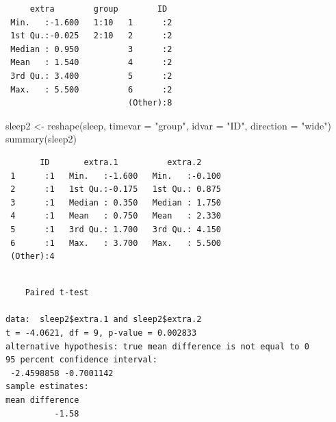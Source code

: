 \documentclass[
  letterpaper,
  DIV=11,
  numbers=noendperiod]{scrreprt}
\newenvironment{Shaded}{\begin{snugshade}}{\end{snugshade}}
\newcommand{\AttributeTok}[1]{\textcolor[rgb]{0.40,0.45,0.13}{#1}}
\newcommand{\ConstantTok}[1]{\textcolor[rgb]{0.56,0.35,0.01}{#1}}
\newcommand{\FloatTok}[1]{\textcolor[rgb]{0.68,0.00,0.00}{#1}}
\newcommand{\FunctionTok}[1]{\textcolor[rgb]{0.28,0.35,0.67}{#1}}
\newcommand{\NormalTok}[1]{\textcolor[rgb]{0.00,0.23,0.31}{#1}}
\newcommand{\OtherTok}[1]{\textcolor[rgb]{0.00,0.23,0.31}{#1}}
\newcommand{\SpecialCharTok}[1]{\textcolor[rgb]{0.37,0.37,0.37}{#1}}
\newcommand{\StringTok}[1]{\textcolor[rgb]{0.13,0.47,0.30}{#1}}
\begin{document}
\begin{verbatim}
     extra        group        ID   
 Min.   :-1.600   1:10   1      :2  
 1st Qu.:-0.025   2:10   2      :2  
 Median : 0.950          3      :2  
 Mean   : 1.540          4      :2  
 3rd Qu.: 3.400          5      :2  
 Max.   : 5.500          6      :2  
                         (Other):8  
\end{verbatim}

\begin{Shaded}
\begin{Highlighting}[]
\NormalTok{sleep2 }\OtherTok{\textless{}{-}} \FunctionTok{reshape}\NormalTok{(sleep, }\AttributeTok{timevar =} \StringTok{"group"}\NormalTok{, }\AttributeTok{idvar =} \StringTok{"ID"}\NormalTok{, }\AttributeTok{direction =} \StringTok{"wide"}\NormalTok{)}
\FunctionTok{summary}\NormalTok{(sleep2)}
\end{Highlighting}
\end{Shaded}

\begin{verbatim}
       ID       extra.1          extra.2      
 1      :1   Min.   :-1.600   Min.   :-0.100  
 2      :1   1st Qu.:-0.175   1st Qu.: 0.875  
 3      :1   Median : 0.350   Median : 1.750  
 4      :1   Mean   : 0.750   Mean   : 2.330  
 5      :1   3rd Qu.: 1.700   3rd Qu.: 4.150  
 6      :1   Max.   : 3.700   Max.   : 5.500  
 (Other):4                                    
\end{verbatim}

\begin{Shaded}
\end{Shaded}

\begin{verbatim}

    Paired t-test

data:  sleep2$extra.1 and sleep2$extra.2
t = -4.0621, df = 9, p-value = 0.002833
alternative hypothesis: true mean difference is not equal to 0
95 percent confidence interval:
 -2.4598858 -0.7001142
sample estimates:
mean difference 
          -1.58 
\end{verbatim}
\end{document}
